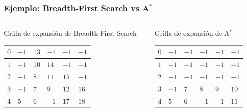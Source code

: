 \begin{frame}
    \frametitle{Ejemplo: Breadth-First Search vs A$^{*}$}
    \begin{footnotesize}
        \begin{columns}[t]
            \begin{column}{5cm}
                \begin{center}
                    Grilla de expansión de Breadth-First Search
                \end{center}
                \begin{tabularx}{\columnwidth}{|X|X|X|X|X|X|}	
                    \hline
                    $0$ & $-1$ & $13$ & $-1$ & $-1$ & $-1$ \\
                    \hline
                    $1$ & $-1$ & $10$ & $14$ & $-1$ & $-1$ \\
                    \hline
                    $2$ & $-1$ & $8$ & $11$ & $15$ & $-1$ \\
                    \hline
                    $3$ & $-1$ & $7$ & $9$ & $12$ & $16$ \\
                    \hline
                    $4$ & $5$ & $6$ & $-1$ & $17$ & $18$ \\
                    \hline
                \end{tabularx}
            \end{column}
            \begin{column}{5cm}
                \begin{center}
                    Grilla de expansión de A$^{*}$
                \end{center}		
                \begin{tabularx}{\columnwidth}{|X|X|X|X|X|X|}		
                    \hline
                    $0$ & $-1$ & $-1$ & $-1$ & $-1$ & $-1$ \\
                    \hline
                    $1$ & $-1$ & $-1$ & $-1$ & $-1$ & $-1$ \\
                    \hline
                    $2$ & $-1$ & $-1$ & $-1$ & $-1$ & $-1$ \\
                    \hline
                    $3$ & $-1$ & $7$ & $8$ & $9$ & $10$ \\
                    \hline
                    $4$ & $5$ & $6$ & $-1$ & $-1$ & $11$ \\
                    \hline
                \end{tabularx}
            \end{column}
        \end{columns}
        

\end{footnotesize}
\end{frame}

